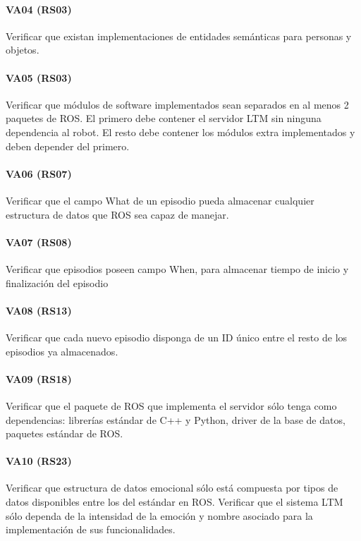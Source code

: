 \paragraph{VA04 (RS03)}
Verificar que existan implementaciones de entidades semánticas para personas y objetos.

\paragraph{VA05 (RS03)}
Verificar que módulos de software implementados sean separados en al menos 2 paquetes de ROS. El primero debe contener el servidor LTM sin ninguna dependencia al robot. El resto debe contener los módulos extra implementados y deben depender del primero.

\paragraph{VA06 (RS07)}
Verificar que el campo What de un episodio pueda almacenar cualquier estructura de datos que ROS sea capaz de manejar.

\paragraph{VA07 (RS08)}
Verificar que episodios poseen campo When, para almacenar tiempo de inicio y finalización del episodio

\paragraph{VA08 (RS13)}
Verificar que cada nuevo episodio disponga de un ID único entre el resto de los episodios ya almacenados.

\paragraph{VA09 (RS18)}
Verificar que el paquete de ROS que implementa el servidor sólo tenga como dependencias: librerías estándar de C++ y Python, driver de la base de datos, paquetes estándar de ROS.


\paragraph{VA10 (RS23)}
Verificar que estructura de datos emocional sólo está compuesta por tipos de datos disponibles entre los del estándar en ROS. Verificar que el sistema LTM sólo dependa de la intensidad de la emoción y nombre asociado para la implementación de sus funcionalidades.


